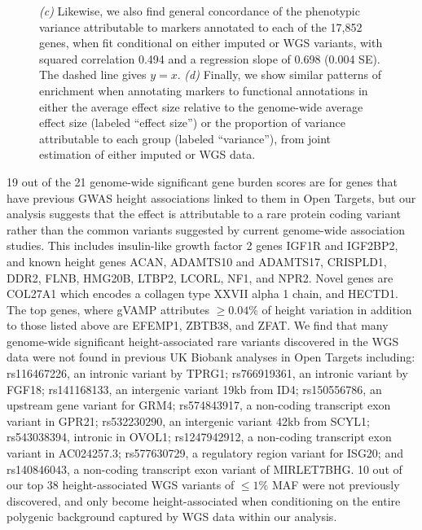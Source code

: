\begin{figure}[!t] %
    \ContinuedFloat
    \captionsetup{labelformat=continued}
    \caption[]{\small{\emph{(c)} Likewise, we also find general concordance of the phenotypic variance attributable to markers annotated to each of the 17,852 genes, when fit conditional on either imputed or WGS variants, with squared correlation 0.494 and a regression slope of 0.698 (0.004 SE). The dashed line gives $y=x$. \emph{(d)} Finally, we show similar patterns of enrichment when annotating markers to functional annotations in either the average effect size relative to the genome-wide average effect size (labeled ``effect size'') or the proportion of variance attributable to each group (labeled ``variance''), from joint estimation of either imputed or WGS data.}}
\end{figure}

19 out of the 21 genome-wide significant gene burden scores are for genes that have previous GWAS height associations linked to them in Open Targets, but our analysis suggests that the effect is attributable to a rare protein coding variant rather than the common variants suggested by current genome-wide association studies. This includes insulin-like growth factor 2 genes IGF1R and IGF2BP2, and known height genes ACAN, ADAMTS10 and ADAMTS17, CRISPLD1, DDR2, FLNB, HMG20B, LTBP2, LCORL, NF1, and NPR2. Novel genes are COL27A1 which encodes a collagen type XXVII alpha 1 chain, and HECTD1. The top genes, where gVAMP attributes $\geq 0.04\%$ of height variation in addition to those listed above are EFEMP1, ZBTB38, and ZFAT. We find that many genome-wide significant height-associated rare variants discovered in the WGS data were not found in previous UK Biobank analyses in Open Targets including: rs116467226, an intronic variant by TPRG1; rs766919361, an intronic variant by FGF18; rs141168133, an intergenic variant 19kb from ID4; rs150556786, an upstream gene variant for GRM4; rs574843917, a non-coding transcript exon variant in GPR21; rs532230290, an intergenic variant 42kb from SCYL1; rs543038394, intronic in OVOL1; rs1247942912, a non-coding transcript exon variant in AC024257.3; rs577630729, a regulatory region variant for ISG20; and rs140846043, a non-coding transcript exon variant of MIRLET7BHG. 10 out of our top 38 height-associated WGS variants of $\leq1\%$ MAF were not previously discovered, and only become height-associated when conditioning on the entire polygenic background captured by WGS data within our analysis. 

